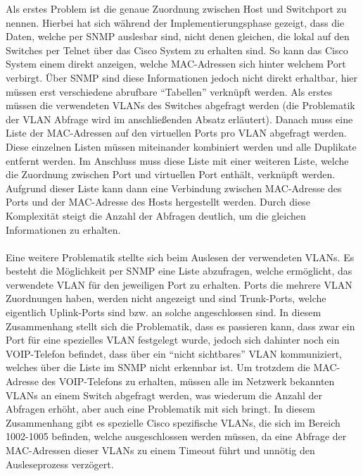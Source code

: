 Als erstes Problem ist die genaue Zuordnung zwischen Host und Switchport zu nennen.
Hierbei hat sich während der Implementierungsphase gezeigt, dass die Daten, welche per SNMP auslesbar sind, nicht denen gleichen, die lokal auf den Switches per Telnet über das Cisco System zu erhalten sind. So kann das Cisco System einem direkt anzeigen, welche MAC-Adressen sich hinter welchem Port verbirgt. Über SNMP sind diese Informationen jedoch nicht direkt erhaltbar, hier müssen erst verschiedene abrufbare “Tabellen” verknüpft werden. Als erstes müssen die verwendeten VLANs des Switches abgefragt werden (die Problematik der VLAN Abfrage wird im anschließenden Absatz erläutert).
Danach muss eine Liste der MAC-Adressen auf den virtuellen Ports pro VLAN abgefragt werden. Diese einzelnen Listen müssen miteinander kombiniert werden und alle Duplikate entfernt werden. Im Anschluss muss diese Liste mit einer weiteren Liste, welche die Zuordnung zwischen Port und virtuellen Port enthält, verknüpft werden. Aufgrund dieser Liste kann dann eine Verbindung zwischen MAC-Adresse des Ports und der MAC-Adresse des Hosts hergestellt werden. Durch diese Komplexität steigt die Anzahl der Abfragen deutlich, um die gleichen Informationen zu erhalten.\\\\
Eine weitere Problematik stellte sich beim Auslesen der verwendeten VLANs. Es besteht die Möglichkeit per SNMP eine Liste abzufragen, welche ermöglicht, das verwendete VLAN für den jeweiligen Port zu erhalten. Ports die mehrere VLAN Zuordnungen haben, werden nicht angezeigt und sind Trunk-Ports, welche eigentlich Uplink-Ports sind bzw. an solche angeschlossen sind. In diesem Zusammenhang stellt sich die Problematik, dass es passieren kann, dass zwar ein Port für eine spezielles VLAN festgelegt wurde, jedoch sich dahinter noch ein VOIP-Telefon befindet, dass über ein “nicht sichtbares” VLAN kommuniziert, welches über die Liste im SNMP nicht erkennbar ist. Um trotzdem die MAC-Adresse des VOIP-Telefons zu erhalten, müssen alle im Netzwerk bekannten VLANs an einem Switch abgefragt werden, was wiederum die Anzahl der Abfragen erhöht, aber auch eine Problematik mit sich bringt. In diesem Zusammenhang gibt es spezielle Cisco spezifische VLANs, die sich im Bereich 1002-1005 befinden, welche ausgeschlossen werden müssen, da eine Abfrage der MAC-Adressen dieser VLANs zu einem Timeout führt und unnötig den Ausleseprozess verzögert.\\\\
